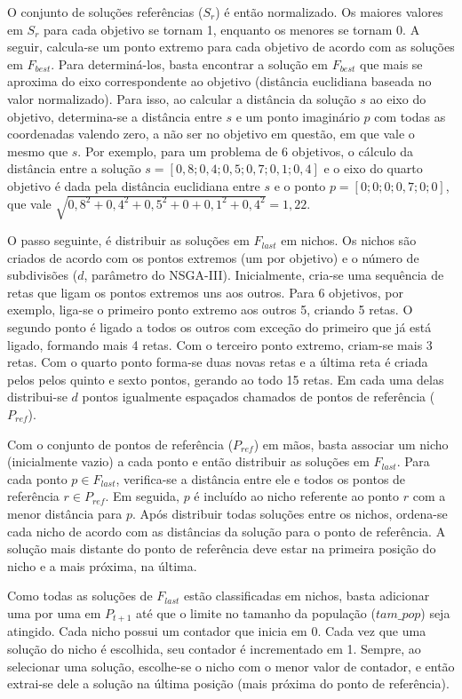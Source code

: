 O conjunto de soluções referências ($S_r$) é então normalizado. Os maiores valores em $S_r$ para cada objetivo se tornam 1, enquanto os menores se tornam 0. A seguir, calcula-se um ponto extremo para cada objetivo de acordo com as soluções em $F_{best}$. Para determiná-los, basta encontrar a solução em $F_{best}$ que mais se aproxima do eixo correspondente ao objetivo (distância euclidiana baseada no valor normalizado). Para isso, ao calcular a distância da solução $s$ ao eixo do objetivo, determina-se a distância entre $s$ e um ponto imaginário $p$ com todas as coordenadas valendo zero, a não ser no objetivo em questão, em que vale o mesmo que $s$. Por exemplo, para um problema de 6 objetivos, o cálculo da distância entre a solução $s = [0,8; 0,4; 0,5; 0,7; 0,1; 0,4]$ e o eixo do quarto objetivo é dada pela distância euclidiana entre $s$ e o ponto $p = [0; 0; 0; 0,7; 0; 0]$, que vale $\sqrt{0,8^2 + 0,4^2 + 0,5^2 + 0 + 0,1^2 + 0,4^2} = 1,22$.

O passo seguinte, é distribuir as soluções em $F_{last}$ em nichos. Os nichos são criados de acordo com os pontos extremos (um por objetivo) e o número de subdivisões ($d$, parâmetro do NSGA-III). Inicialmente, cria-se uma sequência de retas que ligam os pontos extremos uns aos outros. Para 6 objetivos, por exemplo, liga-se o primeiro ponto extremo aos outros 5, criando 5 retas. O segundo ponto é ligado a todos os outros com exceção do primeiro que já está ligado, formando mais 4 retas. Com o terceiro ponto extremo, criam-se mais 3 retas. Com o quarto ponto forma-se duas novas retas e a última reta é criada pelos pelos quinto e sexto pontos, gerando ao todo 15 retas. Em cada uma delas distribui-se $d$ pontos igualmente espaçados chamados de pontos de referência ($P_{ref}$).

Com o conjunto de pontos de referência ($P_{ref}$) em mãos, basta associar um nicho (inicialmente vazio) a cada ponto e então distribuir as soluções em $F_{last}$. Para cada ponto $p \in F_{last}$, verifica-se a distância entre ele e todos os pontos de referência $r \in P_{ref}$. Em seguida, $p$ é incluído ao nicho referente ao ponto $r$ com a menor distância para $p$. Após distribuir todas soluções entre os nichos, ordena-se cada nicho de acordo com as distâncias da solução para o ponto de referência. A solução mais distante do ponto de referência deve estar na primeira posição do nicho e a mais próxima, na última.

Como todas as soluções de $F_{last}$ estão classificadas em nichos, basta adicionar uma por uma em $P_{t+1}$ até que o limite no tamanho da população ($tam\_pop$) seja atingido. Cada nicho possui um contador que inicia em 0. Cada vez que uma solução do nicho é escolhida, seu contador é incrementado em 1. Sempre, ao selecionar uma solução, escolhe-se o nicho com o menor valor de contador, e então extrai-se dele a solução na última posição (mais próxima do ponto de referência).

